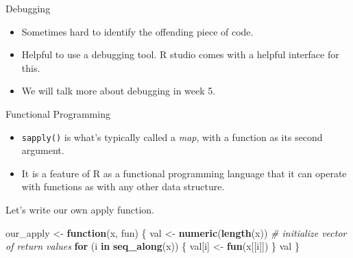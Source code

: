 \documentclass[
  ignorenonframetext,
  aspectratio=1610,
  onlytextwidth]{beamer}
\newenvironment{Shaded}{\begin{snugshade}}{\end{snugshade}}
\newcommand{\CommentTok}[1]{\textcolor[rgb]{0.56,0.35,0.01}{\textit{#1}}}
\newcommand{\ControlFlowTok}[1]{\textcolor[rgb]{0.13,0.29,0.53}{\textbf{#1}}}
\newcommand{\FunctionTok}[1]{\textcolor[rgb]{0.13,0.29,0.53}{\textbf{#1}}}
\newcommand{\NormalTok}[1]{#1}
\newcommand{\OtherTok}[1]{\textcolor[rgb]{0.56,0.35,0.01}{#1}}
\providecommand{\tightlist}{}
\begin{document}
\begin{frame}{Debugging}
\label{debugging}
\begin{itemize}[<+->]
\tightlist
\item
  Sometimes hard to identify the offending piece of code.
\item
  Helpful to use a debugging tool. R studio comes with a helpful
  interface for this.
\item
  We will talk more about debugging in week 5.
\end{itemize}
\end{frame}

\begin{frame}[fragile]{Functional Programming}
\label{functional-programming}
\begin{itemize}[<+->]
\tightlist
\item
  \texttt{sapply()} is what's typically called a \emph{map}, with a
  function as its second argument.
\item
  It is a feature of R as a functional programming language that it can
  operate with functions as with any other data structure.
\end{itemize}

\pause

Let's write our own apply function.

\begin{Shaded}
\begin{Highlighting}[]
\NormalTok{our\_apply }\OtherTok{\textless{}{-}} \ControlFlowTok{function}\NormalTok{(x, fun) \{}
\NormalTok{  val }\OtherTok{\textless{}{-}} \FunctionTok{numeric}\NormalTok{(}\FunctionTok{length}\NormalTok{(x)) }\CommentTok{\# initialize vector of return values}
  \ControlFlowTok{for}\NormalTok{ (i }\ControlFlowTok{in} \FunctionTok{seq\_along}\NormalTok{(x)) \{}
\NormalTok{    val[i] }\OtherTok{\textless{}{-}} \FunctionTok{fun}\NormalTok{(x[[i]])}
\NormalTok{  \}}
\NormalTok{  val}
\NormalTok{\}}
\end{Highlighting}
\end{Shaded}
\end{frame}
\end{document}
